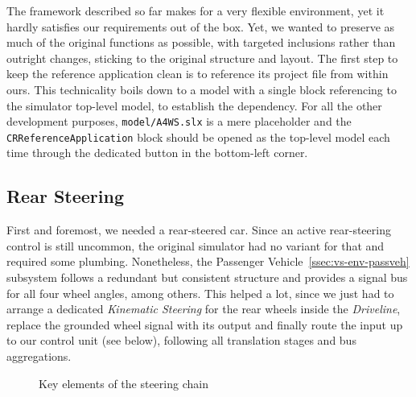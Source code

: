 	The framework described so far makes for a very flexible environment, yet it hardly satisfies our requirements out of the box.
	Yet, we wanted to preserve as much of the original functions as possible, with targeted inclusions rather than outright changes, sticking to the original structure and layout.
	The first step to keep the reference application clean is to reference its project file from within ours. This technicality boils down to a \mwSL{} model with a single block
	referencing to the simulator top-level model, to establish the dependency. For all the other development purposes, \texttt{model/A4WS.slx} is a mere placeholder and the
	\lstinline{CRReferenceApplication} block should be opened as the top-level model each time through the dedicated button in the bottom-left corner.


		\subsection{Rear Steering}

		First and foremost, we needed a rear-steered car. Since an active rear-steering control is still uncommon, the original simulator had no variant for that and required some
		\mwSL{} plumbing. Nonetheless, the Passenger Vehicle~\ref{ssec:vs-env-passveh} subsystem follows a redundant but consistent structure and provides a signal bus
		for all four wheel angles, among others. This helped a lot, since we just had to arrange a dedicated \emph{Kinematic Steering} for the rear wheels inside the
		\emph{Driveline}, replace the grounded wheel signal with its output and finally route the input up to our control unit (see below), following all translation stages and bus
		aggregations.
		\begin{figure}[hbtp]
			\centering
			\quad
			\caption{Key elements of the steering chain}
			\label{fig:passveh-steer}
		\end{figure}

